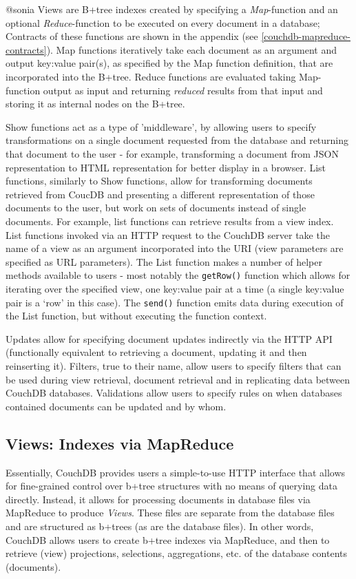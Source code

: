 @sonia
Views are B+tree indexes created by specifying a \textit{Map}-function and an optional \textit{Reduce}-function to be executed on every document in a database; Contracts of these functions are shown in the appendix (see \ref{couchdb-mapreduce-contracts}). Map functions iteratively take each document as an argument and output key:value pair(s), as specified by the Map function definition, that are incorporated into the B+tree. Reduce functions are evaluated taking Map-function output as input and returning \textit{reduced} results from that input and storing it as internal nodes on the B+tree.

Show functions act as a type of 'middleware', by allowing users to specify transformations on a single document requested from the database and returning that document to the user - for example, transforming a document from JSON representation to HTML representation for better display in a browser. List functions, similarly to Show functions, allow for transforming documents retrieved from CoucDB and presenting a different representation of those documents to the user, but work on sets of documents instead of single documents. For example, list functions can retrieve results from a view index. List functions invoked via an HTTP request to the CouchDB server take the name of a view as an argument incorporated into the URI (view parameters are specified as URL parameters). The List function makes a number of helper methods available to users - most notably the \texttt{getRow()} function which allows for iterating over the specified view, one key:value pair at a time (a single key:value pair is a `row' in this case). The \texttt{send()} function emits data during execution of the List function, but without executing the function context.

Updates allow for specifying document updates indirectly via the HTTP API (functionally equivalent to retrieving a document, updating it and then reinserting it). Filters, true to their name, allow users to specify filters that can be used during view retrieval, document retrieval and in replicating data between CouchDB databases. Validations allow users to specify rules on when databases contained documents can be updated and by whom.

\subsection{Views: Indexes via MapReduce}
Essentially, CouchDB provides users a simple-to-use HTTP interface that allows for fine-grained control over b+tree structures with no means of querying data directly. Instead, it allows for processing documents in database files via MapReduce to produce \textit{Views}. These files are separate from the database files and are structured as b+trees (as are the database files). In other words, CouchDB allows users to create b+tree indexes via MapReduce, and then to retrieve (view) projections, selections, aggregations, etc. of the database contents (documents).

